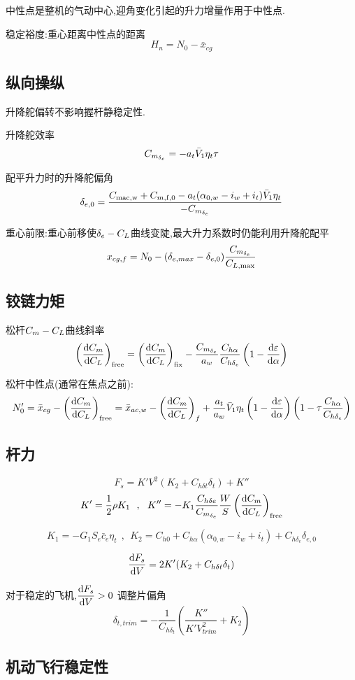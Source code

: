 中性点是整机的气动中心,迎角变化引起的升力增量作用于中性点.

稳定裕度:重心距离中性点的距离
$$H_n=N_0-\bar{x}_{cg}$$

\subsection{纵向操纵}
升降舵偏转不影响握杆静稳定性.

升降舵效率
$$C_{m_{\delta_e}}=-a_t\bar{V}_1\eta_t\tau$$

配平升力时的升降舵偏角
$$\delta_{e,0}=\frac{C_{\mathrm{mac,w}}+C_{m,\mathrm{f,0}}-a_t(\alpha_{0,w}-i_w+i_t)\bar{V}_1\eta_t}{-C_{m_{\delta_e}}}$$

重心前限:重心前移使$\delta_e - {C_L}$曲线变陡,最大升力系数时仍能利用升降舵配平
$$x_{cg,f}=N_0-(\delta_{e,max}-\delta_{e,0})\frac{C_{m_{\delta_e}}}{C_{L,\mathrm{max}}}$$

\subsection{铰链力矩}
松杆${C_m} - {C_L}$曲线斜率
$$\left(\frac{\operatorname{d\!} {C_m}}{\operatorname{d\!} {C_L}}\right)_{\mathrm{free}}=\left(\frac{\operatorname{d\!} {C_m}}{\operatorname{d\!} {C_L}}\right)_{\mathrm{fix}}-\frac{C_{m_{\delta_e}}}{a_w}\frac{C_{h\alpha}}{C_{h\delta_e}}\left(1-\frac{\operatorname{d\!} {\varepsilon}}{\operatorname{d\!} \alpha}\right)$$

松杆中性点(通常在焦点之前):
$$N_0'=\bar{x}_{cg}-\left(\frac{\operatorname{d\!} {C_m}}{\operatorname{d\!} {C_L}}\right)_{\mathrm{free}}=\bar{x}_{ac,w}-\left(\frac{\operatorname{d\!} {C_m}}{\operatorname{d\!} {C_L}}\right)_f+\frac{a_t}{a_w}\bar{V}_1 \eta_t\left(1-\frac{\operatorname{d\!} {\varepsilon}}{\operatorname{d\!} \alpha}\right)\left(1-\tau\frac{C_{h\alpha}}{C_{h\delta_e}}\right)$$

\subsection{杆力}
$$F_s=K'V^2(K_2+C_{h\delta t}\delta_t)+K''$$
$$K'=\frac{1}{2}\rho K_1\ \ ,\ \ K''=-K_1 \frac{C_{h\delta e}}{C_{m_{\delta_e}}}\frac{W}{S}\left(\frac{\operatorname{d\!} {C_m}}{\operatorname{d\!}{C_L}}\right)_{\mathrm{free}}$$

$$K_1=-G_1S_e\bar{c}_e\eta_t\ \ ,\ \ K_2=C_{h0}+C_{h\alpha}(\alpha_{0,w}-i_w+i_t)+C_{h\delta_e}\delta_{e,0}$$

$$\frac{\operatorname{d\!} F_s}{\operatorname{d\!} V}=2K'(K_2+C_{h\delta t}\delta_t)$$

对于稳定的飞机,$\displaystyle \frac{\operatorname{d\!} F_s}{\operatorname{d\!} V}>0$
调整片偏角
$$\delta_{t,trim}=-\frac{1}{C_{h\delta_t}}\left(\frac{K''}{K'V^2_{trim}}+K_2\right)$$

\subsection{机动飞行稳定性}


